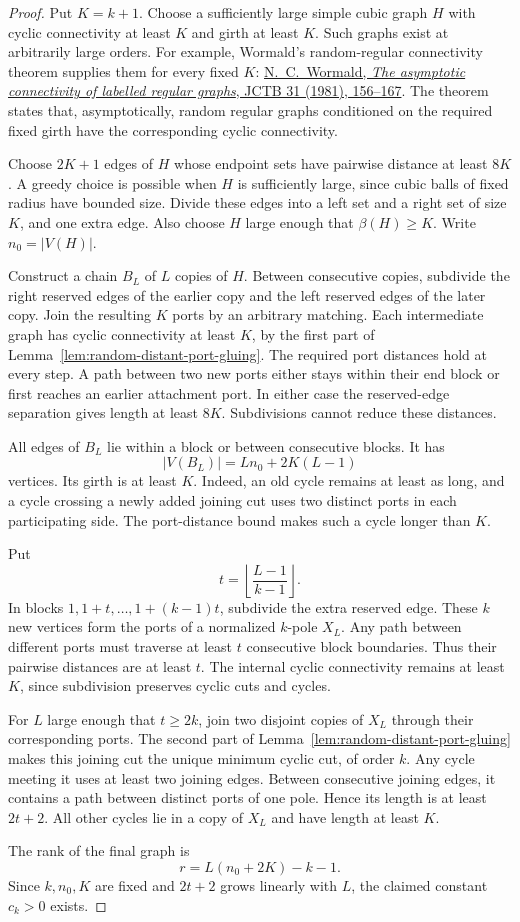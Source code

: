 \begin{proof}
Put $K=k+1$.
Choose a sufficiently large simple cubic graph $H$ with cyclic connectivity at least $K$ and girth at least $K$.
Such graphs exist at arbitrarily large orders.
For example, Wormald's random-regular connectivity theorem supplies them for every fixed $K$:
\href{https://doi.org/10.1016/S0095-8956(81)80021-4}{N.~C.~Wormald, \emph{The asymptotic connectivity of labelled regular graphs}, JCTB 31 (1981), 156--167}.
The theorem states that, asymptotically, random regular graphs conditioned on the required fixed girth have the corresponding cyclic connectivity.

Choose $2K+1$ edges of $H$ whose endpoint sets have pairwise distance at least $8K$.
A greedy choice is possible when $H$ is sufficiently large, since cubic balls of fixed radius have bounded size.
Divide these edges into a left set and a right set of size $K$, and one extra edge.
Also choose $H$ large enough that $\beta(H)\ge K$.
Write $n_0=|V(H)|$.

Construct a chain $B_L$ of $L$ copies of $H$.
Between consecutive copies, subdivide the right reserved edges of the earlier copy and the left reserved edges of the later copy.
Join the resulting $K$ ports by an arbitrary matching.
Each intermediate graph has cyclic connectivity at least $K$, by the first part of Lemma~\ref{lem:random-distant-port-gluing}.
The required port distances hold at every step.
A path between two new ports either stays within their end block or first reaches an earlier attachment port.
In either case the reserved-edge separation gives length at least $8K$.
Subdivisions cannot reduce these distances.

All edges of $B_L$ lie within a block or between consecutive blocks.
It has
\[
 |V(B_L)|=L n_0+2K(L-1)
\]
vertices.
Its girth is at least $K$.
Indeed, an old cycle remains at least as long, and a cycle crossing a newly added joining cut uses two distinct ports in each participating side.
The port-distance bound makes such a cycle longer than $K$.

Put
\[
 t=\left\lfloor\frac{L-1}{k-1}\right\rfloor.
\]
In blocks $1,1+t,\ldots,1+(k-1)t$, subdivide the extra reserved edge.
These $k$ new vertices form the ports of a normalized $k$-pole $X_L$.
Any path between different ports must traverse at least $t$ consecutive block boundaries.
Thus their pairwise distances are at least $t$.
The internal cyclic connectivity remains at least $K$, since subdivision preserves cyclic cuts and cycles.

For $L$ large enough that $t\ge2k$, join two disjoint copies of $X_L$ through their corresponding ports.
The second part of Lemma~\ref{lem:random-distant-port-gluing} makes this joining cut the unique minimum cyclic cut, of order $k$.
Any cycle meeting it uses at least two joining edges.
Between consecutive joining edges, it contains a path between distinct ports of one pole.
Hence its length is at least $2t+2$.
All other cycles lie in a copy of $X_L$ and have length at least $K$.

The rank of the final graph is
\[
 r=L(n_0+2K)-k-1.
\]
Since $k,n_0,K$ are fixed and $2t+2$ grows linearly with $L$, the claimed constant $c_k>0$ exists.
\end{proof}

